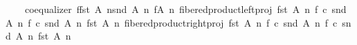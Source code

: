 \begin{isabellebody}
\ \ \ \ coequalizer\ {\isacharparenleft}{\kern0pt}f{\isasymlparr}fst\ {\isacharparenleft}{\kern0pt}A{\isacharcomma}{\kern0pt}\ n{\isacharparenright}{\kern0pt}{\isasymrparr}\isactrlbsub snd\ {\isacharparenleft}{\kern0pt}A{\isacharcomma}{\kern0pt}\ n{\isacharparenright}{\kern0pt}\isactrlesub {\isacharparenright}{\kern0pt}\ {\isacharparenleft}{\kern0pt}f{\isasymrestriction}\isactrlbsub {\isacharparenleft}{\kern0pt}A{\isacharcomma}{\kern0pt}\ n{\isacharparenright}{\kern0pt}\isactrlesub {\isacharparenright}{\kern0pt}\ {\isacharparenleft}{\kern0pt}fibered{\isacharunderscore}{\kern0pt}product{\isacharunderscore}{\kern0pt}left{\isacharunderscore}{\kern0pt}proj\ {\isacharparenleft}{\kern0pt}fst\ {\isacharparenleft}{\kern0pt}A{\isacharcomma}{\kern0pt}\ n{\isacharparenright}{\kern0pt}{\isacharparenright}{\kern0pt}\ {\isacharparenleft}{\kern0pt}f\ {\isasymcirc}\isactrlsub c\ snd\ {\isacharparenleft}{\kern0pt}A{\isacharcomma}{\kern0pt}\ n{\isacharparenright}{\kern0pt}{\isacharparenright}{\kern0pt}\ {\isacharparenleft}{\kern0pt}f\ {\isasymcirc}\isactrlsub c\ snd\ {\isacharparenleft}{\kern0pt}A{\isacharcomma}{\kern0pt}\ n{\isacharparenright}{\kern0pt}{\isacharparenright}{\kern0pt}\ {\isacharparenleft}{\kern0pt}fst\ {\isacharparenleft}{\kern0pt}A{\isacharcomma}{\kern0pt}\ n{\isacharparenright}{\kern0pt}{\isacharparenright}{\kern0pt}{\isacharparenright}{\kern0pt}\ {\isacharparenleft}{\kern0pt}fibered{\isacharunderscore}{\kern0pt}product{\isacharunderscore}{\kern0pt}right{\isacharunderscore}{\kern0pt}proj\ {\isacharparenleft}{\kern0pt}fst\ {\isacharparenleft}{\kern0pt}A{\isacharcomma}{\kern0pt}\ n{\isacharparenright}{\kern0pt}{\isacharparenright}{\kern0pt}\ {\isacharparenleft}{\kern0pt}f\ {\isasymcirc}\isactrlsub c\ snd\ {\isacharparenleft}{\kern0pt}A{\isacharcomma}{\kern0pt}\ n{\isacharparenright}{\kern0pt}{\isacharparenright}{\kern0pt}\ {\isacharparenleft}{\kern0pt}f\ {\isasymcirc}\isactrlsub c\ snd\ {\isacharparenleft}{\kern0pt}A{\isacharcomma}{\kern0pt}\ n{\isacharparenright}{\kern0pt}{\isacharparenright}{\kern0pt}\ {\isacharparenleft}{\kern0pt}fst\ {\isacharparenleft}{\kern0pt}A{\isacharcomma}{\kern0pt}\ n{\isacharparenright}{\kern0pt}{\isacharparenright}{\kern0pt}{\isacharparenright}{\kern0pt}\ {\isasymand}\isanewline

\end{isabellebody}
